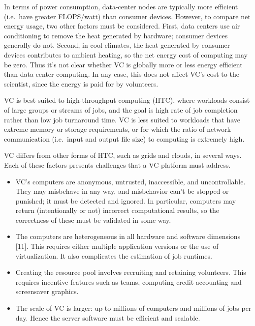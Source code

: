 \documentclass[
]{article}
\providecommand{\tightlist}{%
  \setlength{\itemsep}{0pt}\setlength{\parskip}{0pt}}
\begin{document}
In terms of power consumption, data-center nodes are typically more
efficient (i.e.~have greater FLOPS/watt) than consumer devices. However,
to compare net energy usage, two other factors must be considered.
First, data centers use air conditioning to remove the heat generated by
hardware; consumer devices generally do not. Second, in cool climates,
the heat generated by consumer devices contributes to ambient heating,
so the net energy cost of computing may be zero. Thus it's not clear
whether VC is globally more or less energy efficient than data-center
computing. In any case, this does not affect VC's cost to the scientist,
since the energy is paid for by volunteers.

VC is best suited to high-throughput computing (HTC), where workloads
consist of large groups or streams of jobs, and the goal is high rate of
job completion rather than low job turnaround time. VC is less suited to
workloads that have extreme memory or storage requirements, or for which
the ratio of network communication (i.e.~input and output file size) to
computing is extremely high.

VC differs from other forms of HTC, such as grids and clouds, in several
ways. Each of these factors presents challenges that a VC platform must
address.

\begin{itemize}
\tightlist
\item
  VC's computers are anonymous, untrusted, inaccessible, and
  uncontrollable. They may misbehave in any way, and misbehavior can't
  be stopped or punished; it must be detected and ignored. In
  particular, computers may return (intentionally or not) incorrect
  computational results, so the correctness of these must be validated
  in some way.\\
\item
  The computers are heterogeneous in all hardware and software
  dimensions {[}11{]}. This requires either multiple application
  versions or the use of virtualization. It also complicates the
  estimation of job runtimes.\\
\item
  Creating the resource pool involves recruiting and retaining
  volunteers. This requires incentive features such as teams, computing
  credit accounting and screensaver graphics.\\
\item
  The scale of VC is larger: up to millions of computers and millions of
  jobs per day. Hence the server software must be efficient and
  scalable.
\end{itemize}
\end{document}
